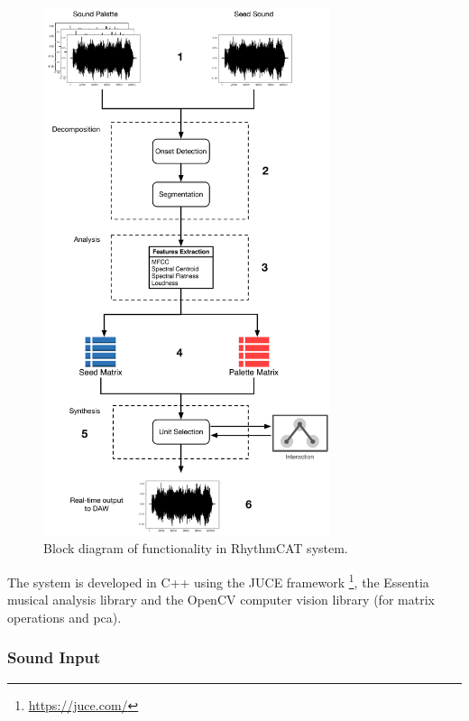 \begin{figure}
	\begin{center}
		\includegraphics[width=0.75\textwidth]{ch06_rhythmcat/figures/rhythmcat_flowchart.pdf}
	\end{center}
	\caption[Block diagram of functionality in RhythmCAT system]{Block diagram of functionality in RhythmCAT system.}
	\label{fig:rhythmcat_flowchart}
\end{figure}

The system is developed in C++ using the JUCE framework \footnote{\url{https://juce.com/}}, the Essentia musical analysis library \citep{Bogdanov2013} and the OpenCV computer vision library \citep{Bradski2000} (for matrix operations and \acrshort{pca}).
 
\subsubsection{Sound Input}

